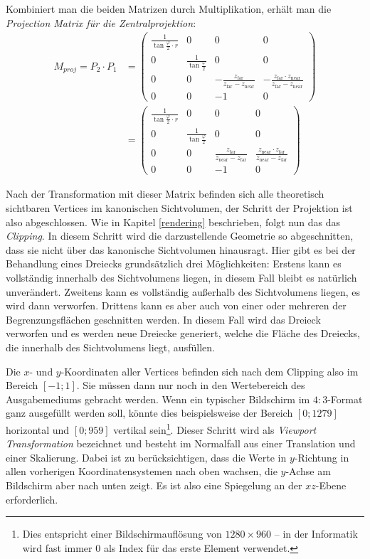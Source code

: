 Kombiniert man die beiden Matrizen durch Multiplikation, erhält man die \emph{Projection Matrix für die Zentralprojektion}:
\begin{equation}
\begin{split}
 M_{proj} = P_2 \cdot P_1 &= 
 \begin{pmatrix}
  \frac{1}{\tan\frac{\varphi}{2} \cdot r} & 0 & 0 & 0 \\
  0 & \frac{1}{\tan\frac{\varphi}{2}} & 0 & 0 \\
  0 & 0 & -\frac{z_\mathrm{far}}{z_\mathrm{far}-z_\mathrm{near}} & -\frac{z_\mathrm{far} \cdot z_\mathrm{near}}{z_\mathrm{far}-z_\mathrm{near}} \\
  0 & 0 & -1 & 0
 \end{pmatrix} \\
 &= 
 \begin{pmatrix}
  \frac{1}{\tan\frac{\varphi}{2} \cdot r} & 0 & 0 & 0 \\
  0 & \frac{1}{\tan\frac{\varphi}{2}} & 0 & 0 \\
  0 & 0 & \frac{z_\mathrm{far}}{z_\mathrm{near}-z_\mathrm{far}} & \frac{z_\mathrm{near} \cdot z_\mathrm{far}}{z_\mathrm{near}-z_\mathrm{far}} \\
  0 & 0 & -1 & 0
 \end{pmatrix}
\end{split}
\end{equation}

Nach der Transformation mit dieser Matrix befinden sich alle theoretisch sichtbaren Vertices im kanonischen Sichtvolumen, der Schritt der Projektion ist also abgeschlossen. Wie in Kapitel \ref{rendering} beschrieben, folgt nun das das \emph{Clipping}. In diesem Schritt wird die darzustellende Geometrie so abgeschnitten, dass sie nicht über das kanonische Sichtvolumen hinausragt. Hier gibt es bei der Behandlung eines Dreiecks grundsätzlich drei Möglichkeiten: Erstens kann es vollständig innerhalb des Sichtvolumens liegen, in diesem Fall bleibt es natürlich unverändert. Zweitens kann es vollständig außerhalb des Sichtvolumens liegen, es wird dann verworfen. Drittens kann es aber auch von einer oder mehreren der Begrenzungsflächen geschnitten werden. In diesem Fall wird das Dreieck verworfen und es werden neue Dreiecke generiert, welche die Fläche des Dreiecks, die innerhalb des Sichtvolumens liegt, ausfüllen.

Die $x$- und $y$-Koordinaten aller Vertices befinden sich nach dem Clipping also im Bereich $\left[ -1; 1 \right]$. Sie müssen dann nur noch in den Wertebereich des Ausgabemediums gebracht werden. Wenn ein typischer Bildschirm im $4:3$-Format ganz ausgefüllt werden soll, könnte dies beispielsweise der Bereich $\left[ 0; 1279 \right]$ horizontal und $\left[ 0; 959 \right]$ vertikal sein\footnote{Dies entspricht einer Bildschirmauflösung von $1280 \times 960$ -- in der Informatik wird fast immer $0$ als Index für das erste Element verwendet.}. Dieser Schritt wird als \emph{Viewport Transformation} bezeichnet und besteht im Normalfall aus einer Translation und einer Skalierung. Dabei ist zu berücksichtigen, dass die Werte in $y$-Richtung in allen vorherigen Koordinatensystemen nach oben wachsen, die $y$-Achse am Bildschirm aber nach unten zeigt. Es ist also eine Spiegelung an der $xz$-Ebene erforderlich.